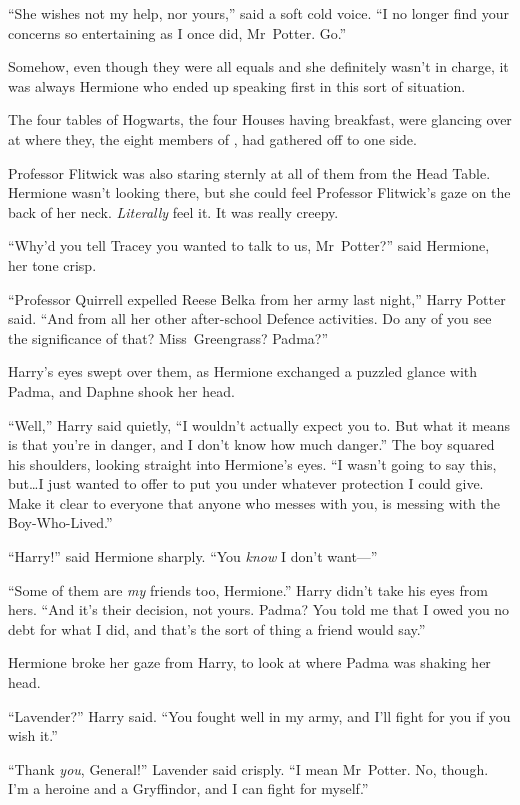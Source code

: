 “She wishes not my help, nor yours,” said a soft cold voice. “I no longer find your concerns so entertaining as I once did, Mr~Potter. Go.”

\later

Somehow, even though they were all equals and she definitely wasn’t in charge, it was always Hermione who ended up speaking first in this sort of situation.

The four tables of Hogwarts, the four Houses having breakfast, were glancing over at where they, the eight members of \SPHEW, had gathered off to one side.

Professor Flitwick was also staring sternly at all of them from the Head Table. Hermione wasn’t looking there, but she could feel Professor Flitwick’s gaze on the back of her neck. \emph{Literally} feel it. It was really creepy.

“Why’d you tell Tracey you wanted to talk to us, Mr~Potter?” said Hermione, her tone crisp.

“Professor Quirrell expelled Reese Belka from her army last night,” Harry Potter said. “And from all her other after-school Defence activities. Do any of you see the significance of that? Miss~Greengrass? Padma?”

Harry’s eyes swept over them, as Hermione exchanged a puzzled glance with Padma, and Daphne shook her head.

“Well,” Harry said quietly, “I wouldn’t actually expect you to. But what it means is that you’re in danger, and I don’t know how much danger.” The boy squared his shoulders, looking straight into Hermione’s eyes. “I wasn’t going to say this, but…I just wanted to offer to put you under whatever protection I could give. Make it clear to everyone that anyone who messes with you, is messing with the Boy-Who-Lived.”

“Harry!” said Hermione sharply. “You \emph{know} I don’t want—”

“Some of them are \emph{my} friends too, Hermione.” Harry didn’t take his eyes from hers. “And it’s their decision, not yours. Padma? You told me that I owed you no debt for what I did, and that’s the sort of thing a friend would say.”

Hermione broke her gaze from Harry, to look at where Padma was shaking her head.

“Lavender?” Harry said. “You fought well in my army, and I’ll fight for you if you wish it.”

“Thank \emph{you}, General!” Lavender said crisply. “I mean Mr~Potter. No, though. I’m a heroine and a Gryffindor, and I can fight for myself.”

